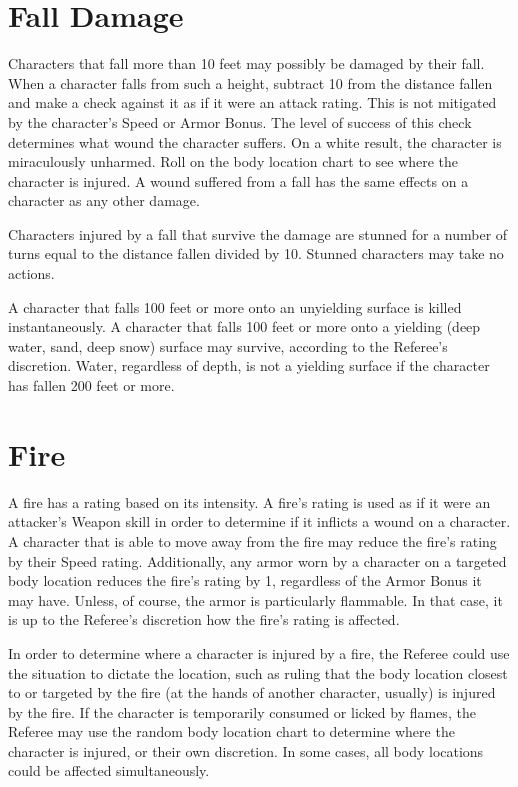 \documentclass[oneside]{book}
\begin{document}
\begin{multicols}{2}

\section{Fall Damage}

Characters that fall more than 10 feet may possibly be damaged by their fall. When a character falls from such a height, subtract 10 from the distance fallen and make a check against it as if it were an attack rating. This is not mitigated by the character's Speed or Armor Bonus. The level of success of this check determines what wound the character suffers. On a white result, the character is miraculously unharmed. Roll on the body location chart to see where the character is injured. A wound suffered from a fall has the same effects on a character as any other damage. 

Characters injured by a fall that survive the damage are stunned for a number of turns equal to the distance fallen divided by 10. Stunned characters may take no actions. 

A character that falls 100 feet or more onto an unyielding surface is killed instantaneously. A character that falls 100 feet or more onto a yielding (deep water, sand, deep snow) surface may survive, according to the Referee's discretion. Water, regardless of depth, is not a yielding surface if the character has fallen 200 feet or more. 

\section{Fire}

A fire has a rating based on its intensity. A fire's rating is used as if it were an attacker's Weapon skill in order to determine if it inflicts a wound on a character. A character that is able to move away from the fire may reduce the fire's rating by their Speed rating. Additionally, any armor worn by a character on a targeted body location reduces the fire's rating by 1, regardless of the Armor Bonus it may have. Unless, of course, the armor is particularly flammable. In that case, it is up to the Referee's discretion how the fire's rating is affected. 

In order to determine where a character is injured by a fire, the Referee could use the situation to dictate the location, such as ruling that the body location closest to or targeted by the fire (at the hands of another character, usually) is injured by the fire. If the character is temporarily consumed or licked by flames, the Referee may use the random body location chart to determine where the character is injured, or their own discretion. In some cases, all body locations could be affected simultaneously.


\end{multicols}
\end{document}
